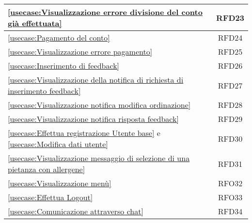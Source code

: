 \begin{longtable}{|l|c|}
	\hline
	\autoref{usecase:Visualizzazione errore divisione del conto già effettuata}                                                                                  & RFD23                  \\
	\hline
	\autoref{usecase:Pagamento del conto}                                                                                                                        & RFD24                  \\
	\hline
	\autoref{usecase:Visualizzazione errore pagamento}                                                                                                           & RFD25                  \\
	\hline
	\autoref{usecase:Inserimento di feedback}                                                                                                                    & RFD26                  \\
	\hline
	\autoref{usecase:Visualizzazione della notifica di richiesta di inserimento feedback}                                                                        & RFD27                  \\
	\hline
	\autoref{usecase:Visualizzazione notifica modifica ordinazione}                                                                                              & RFD28                  \\
	\hline
	\autoref{usecase:Visualizzazione notifica risposta feedback}                                                                                                 & RFD29                  \\
	\hline
	\autoref{usecase:Effettua registrazione Utente base} e \autoref{usecase:Modifica dati utente}                                                                & RFD30                  \\
	\hline
	\autoref{usecase:Visualizzazione messaggio di selezione di una pietanza con allergene}                                                                       & RFD31                  \\
	\hline
	\autoref{usecase:Visualizzazione menù}                                                                                                                       & RFO32                  \\
	\hline
	\autoref{usecase:Effettua Logout}                                                                                                                            & RFO33                  \\
	\hline
	\autoref{usecase:Comunicazione attraverso chat}                                                                                                              & RFD34                  \\

\end{longtable}
